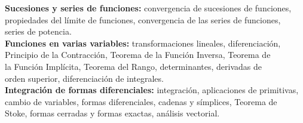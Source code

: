 \documentclass[12pt,letterpaper]{article}
\newcommand\tab[1][1.5cm]{\hspace*{#1}}
\begin{document}
\tab \qquad \textbf{Sucesiones y series de funciones:} convergencia de sucesiones de funciones, \\
	\tab \qquad \qquad propiedades del límite de funciones, convergencia de las series de funciones, \\
	\tab \qquad \qquad series de potencia.\\
\tab \qquad \textbf{Funciones en varias variables:} transformaciones lineales, diferenciación, \\
	\tab \qquad \qquad Principio de la Contracción, Teorema de la Función Inversa, Teorema de \\
	\tab \qquad \qquad la Función Implícita, Teorema del Rango, determinantes, derivadas de \\
	\tab \qquad \qquad orden superior, diferenciación de integrales.\\
\tab \qquad \textbf{Integración de formas diferenciales:} integración, aplicaciones de primitivas, \\	
	\tab \qquad \qquad cambio de variables, formas diferenciales, cadenas y símplices, Teorema de \\
	\tab \qquad \qquad Stoke, formas cerradas y formas exactas, análisis vectorial.\\
\end{document}
